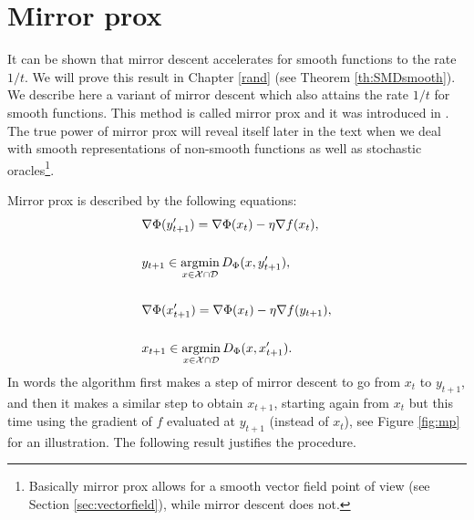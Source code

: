 \section{Mirror prox}
It can be shown that mirror descent accelerates for smooth functions to the rate $1/t$. We will prove this result in Chapter \ref{rand} (see Theorem \ref{th:SMDsmooth}). We describe here a variant of mirror descent which also attains the rate $1/t$ for smooth functions. This method is called mirror prox and it was introduced in \cite{Nem04}. 
The true power of mirror prox will reveal itself later in the text when we deal with smooth representations of non-smooth functions as well as stochastic oracles\footnote{Basically mirror prox allows for a smooth vector field point of view (see Section \ref{sec:vectorfield}), while mirror descent does not.}.

Mirror prox is described by the following equations:
\begin{align*}
& \nabla \Phi(y_{t+1}') = \nabla \Phi(x_{t}) - \eta \nabla f(x_t), \\ \\
& y_{t+1} \in \mathop{\mathrm{argmin}}_{x \in \mathcal{X} \cap \mathcal{D}} D_{\Phi}(x,y_{t+1}') , \\  \\
& \nabla \Phi(x_{t+1}') = \nabla \Phi(x_{t}) - \eta \nabla f(y_{t+1}), \\ \\
& x_{t+1} \in \mathop{\mathrm{argmin}}_{x \in \mathcal{X} \cap \mathcal{D}} D_{\Phi}(x,x_{t+1}') .
\end{align*}
In words the algorithm first makes a step of mirror descent to go from $x_t$ to $y_{t+1}$, and then it makes a similar step to obtain $x_{t+1}$, starting again from $x_t$ but this time using the gradient of $f$ evaluated at $y_{t+1}$ (instead of $x_t$), see Figure \ref{fig:mp} for an illustration. The following result justifies the procedure.

